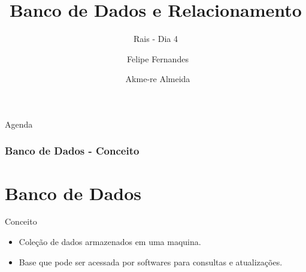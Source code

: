 \documentclass{beamer}
\title{Banco de Dados e Relacionamento}
\subtitle{Rais - Dia 4}
\author[Felipe e Akme-re]{~Felipe Fernandes \and ~Akme-re Almeida}
\institute[Fabsoft] %
{}
\date{}
\begin{document}
\begin{frame}

  \titlepage
  
\end{frame}

\begin{frame}{Agenda}
  \tableofcontents
\end{frame}
\begin{frame}[fragile]

\frametitle{Banco de Dados - Conceito}
\section{Banco de Dados}

\begin{block}{\LARGE Conceito}
	\begin{itemize}
		\item \LARGE Coleção de dados armazenados em uma maquina.
		\item \LARGE Base que pode ser acessada por softwares para consultas e atualizações.
	\end{itemize}
\end{block}

%  	
\end{frame}
\end{document}
